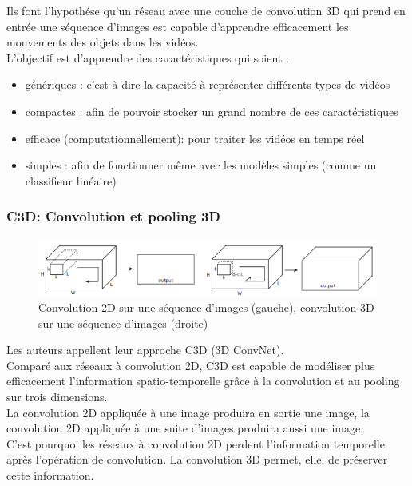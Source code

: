 \documentclass[11pt]{article}
\begin{document}
Ils font l'hypothése qu'un réseau avec une couche de convolution 3D qui prend en entrée une séquence d'images est capable d'apprendre efficacement les mouvements des objets dans les vidéos.\\

L'objectif est d'apprendre des caractéristiques qui soient :\\
\begin{itemize}
\item génériques : c'est à dire la capacité à représenter différents types de vidéos\\
\item compactes : afin de pouvoir stocker un grand nombre de ces caractéristiques\\
\item efficace (computationnellement): pour traiter les vidéos en temps réel\\
\item simples : afin de fonctionner même avec les modèles simples (comme un classifieur linéaire)\\
\end{itemize}

\subsubsection{C3D: Convolution et pooling 3D}
\label{sec:org07a257d}
\begin{figure}[htbp]
\centering
\includegraphics[width=.9\linewidth]{c3d_idea.png}
\caption{Convolution 2D sur une séquence d'images (gauche), convolution 3D sur une séquence d'images (droite) \label{c3d-idea}}
\end{figure}
Les auteurs appellent leur approche C3D (3D ConvNet).\\
Comparé aux réseaux à convolution 2D, C3D est capable de modéliser plus efficacement l'information spatio-temporelle grâce à la convolution et au pooling sur trois dimensions.\\
La convolution 2D appliquée à une image produira en sortie une image, la convolution 2D appliquée à une suite d'images produira aussi une image.\\
C'est pourquoi les réseaux à convolution 2D perdent l'information temporelle après l'opération de convolution. La convolution 3D permet, elle, de préserver cette information.\\
\end{document}
